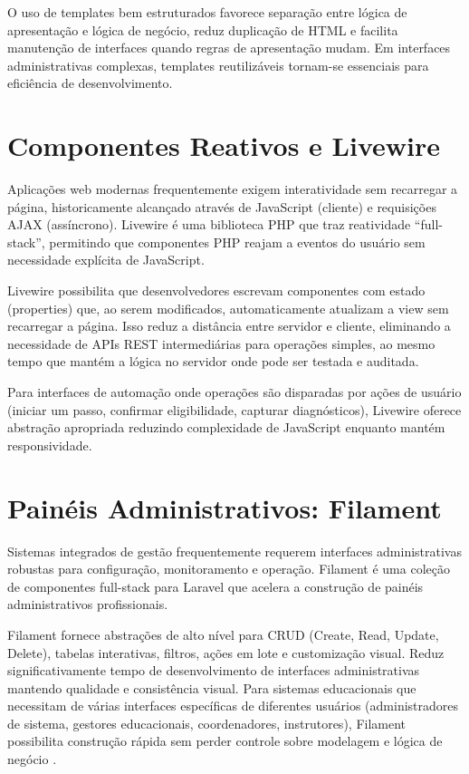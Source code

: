 O uso de templates bem estruturados favorece separação entre lógica de
apresentação e lógica de negócio, reduz duplicação de HTML e facilita
manutenção de interfaces quando regras de apresentação mudam. Em interfaces
administrativas complexas, templates reutilizáveis tornam-se essenciais para
eficiência de desenvolvimento.

\section{Componentes Reativos e Livewire}
\label{sec:revbib:components}

Aplicações web modernas frequentemente exigem interatividade sem recarregar a
página, historicamente alcançado através de JavaScript (cliente) e requisições
AJAX (assíncrono). Livewire \cite{Livewire2024} é uma biblioteca PHP que traz
reatividade ``full-stack'', permitindo que componentes PHP reajam a eventos do
usuário sem necessidade explícita de JavaScript.

Livewire possibilita que desenvolvedores escrevam componentes com estado
(properties) que, ao serem modificados, automaticamente atualizam a view sem
recarregar a página. Isso reduz a distância entre servidor e cliente,
eliminando a necessidade de APIs REST intermediárias para operações simples,
ao mesmo tempo que mantém a lógica no servidor onde pode ser testada e
auditada.

Para interfaces de automação onde operações são disparadas por ações de usuário
(iniciar um passo, confirmar eligibilidade, capturar diagnósticos), Livewire
oferece abstração apropriada reduzindo complexidade de JavaScript enquanto
mantém responsividade.

\section{Painéis Administrativos: Filament}
\label{sec:revbib:admin}

Sistemas integrados de gestão frequentemente requerem interfaces administrativas
robustas para configuração, monitoramento e operação. Filament
\cite{Filament2024,FilamentAdminPanel2024} é uma coleção de componentes
full-stack para Laravel que acelera a construção de painéis administrativos
profissionais.

Filament fornece abstrações de alto nível para CRUD (Create, Read, Update,
Delete), tabelas interativas, filtros, ações em lote e customização visual.
Reduz significativamente tempo de desenvolvimento de interfaces administrativas
mantendo qualidade e consistência visual. Para sistemas educacionais que
necessitam de várias interfaces específicas de diferentes usuários
(administradores de sistema, gestores educacionais, coordenadores, instrutores),
Filament possibilita construção rápida sem perder controle sobre modelagem e
lógica de negócio \cite{FilamentAdminPanel2024}.

